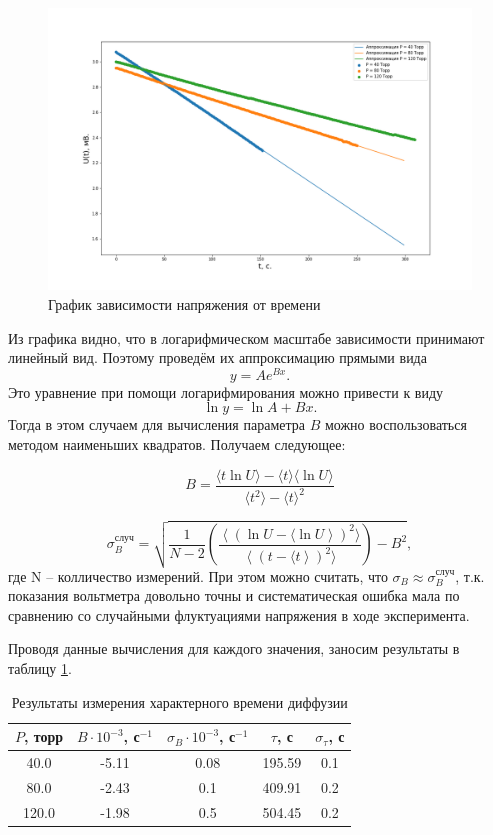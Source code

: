 \documentclass[a4paper, 12pt]{article}
\begin{document}
\begin{figure}
    \centering
	\includegraphics[width=\linewidth]{U_from_t_graph.png}
	\caption{График зависимости напряжения от времени}
	\label{u_from_t_graph}
\end{figure}

Из графика видно, что в логарифмическом масштабе зависимости принимают линейный вид. Поэтому проведём их аппроксимацию прямыми вида \[ y=Ae^{Bx}. \] Это уравнение при помощи логарифмирования можно привести к виду \[ \ln y = \ln A + Bx. \] Тогда в этом случаем для вычисления параметра $ B $ можно воспользоваться методом наименьших квадратов. Получаем следующее:

\begin{equation}\label{mnk:B}
B=\frac{\langle t\ln U \rangle - \langle t\rangle \langle \ln U\rangle}{\langle t^2 \rangle - \langle t \rangle^2}
\end{equation}

\begin{equation}\label{mnk:sigmaB}
\sigma^\text{случ}_B = \sqrt{\frac{1}{N-2} \left(\frac{\left\langle\left(\ln U - \langle \ln U\right\rangle\right)^2 \rangle}{\left\langle\left(t - \langle t\right\rangle\right)^2 \rangle}\right)-B^2},
\end{equation}
где N -- колличество измерений. При этом можно считать, что $ \sigma_B \approx \sigma_B^\text{случ} $, т.к. показания вольтметра довольно точны и систематическая ошибка мала по сравнению со случайными флуктуациями напряжения в ходе эксперимента.


Проводя данные вычисления для каждого значения, заносим результаты в таблицу \ref{tab:approx}.

\begin{table}
	\centering
	\begin{tabular}{|c|c|c|c|c|}
		\hline
		$ P $, торр & $ B \cdot 10^{-3} $, с$ ^{-1} $ & $ \sigma_{B} \cdot 10^{-3} $, с$ ^{-1} $ & $ \tau $, с & $ \sigma_\tau $, с \\ \hline
		40.0  & -5.11 & 0.08 & 195.59 & 0.1 \\ \hline
		80.0  & -2.43 & 0.1 & 409.91  & 0.2 \\ \hline
		120.0 & -1.98 & 0.5 & 504.45  & 0.2 \\ \hline
	\end{tabular}
	\caption{Результаты измерения характерного времени диффузии}
	\label{tab:approx}
\end{table}
\end{document}
